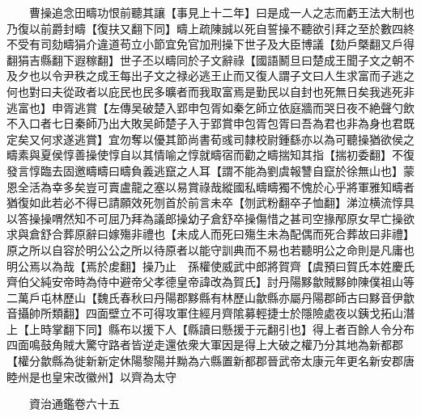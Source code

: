 　　曹操追念田疇功恨前聽其讓【事見上十二年】曰是成一人之志而虧王法大制也乃復以前爵封疇【復扶又翻下同】疇上疏陳誠以死自誓操不聽欲引拜之至於數四終不受有司劾疇狷介違道苟立小節宜免官加刑操下世子及大臣博議【劾戶槩翻又戶得翻狷吉縣翻下遐稼翻】世子丕以疇同於子文辭祿【國語鬭旦曰楚成王聞子文之朝不及夕也以令尹秩之成王每出子文之禄必逃王止而又復人謂子文曰人生求富而子逃之何也對曰夫從政者以庇民也民多曠者而我取富焉是勤民以自封也死無日矣我逃死非逃富也】申胥逃賞【左傳吴破楚入郢申包胥如秦乞師立依庭牆而哭日夜不絶聲勺飲不入口者七日秦師乃出大敗吴師楚子入于郢賞申包胥包胥曰吾為君也非為身也君既定矣又何求遂逃賞】宜勿奪以優其節尚書荀彧司隸校尉鍾繇亦以為可聽操猶欲侯之疇素與夏侯惇善操使惇自以其情喻之惇就疇宿而勸之疇揣知其指【揣初委翻】不復發言惇臨去固邀疇疇曰疇負義逃竄之人耳【謂不能為劉虞報讐自竄於徐無山也】蒙恩全活為幸多矣豈可賣盧龍之塞以易賞祿哉縱國私疇疇獨不愧於心乎將軍雅知疇者猶復如此若必不得已請願效死刎首於前言未卒【刎武粉翻卒子恤翻】涕泣横流惇具以答操操喟然知不可屈乃拜為議郎操幼子倉舒卒操傷惜之甚司空掾邴原女早亡操欲求與倉舒合葬原辭曰嫁殤非禮也【未成人而死曰殤生未為配偶而死合葬故曰非禮】原之所以自容於明公公之所以待原者以能守訓典而不易也若聽明公之命則是凡庸也明公焉以為哉【焉於䖍翻】操乃止　孫權使威武中郎將賀齊【虞預曰賀氏本姓慶氏齊伯父純安帝時為侍中避帝父孝德皇帝諱改為賀氏】討丹陽黟歙賊黟帥陳僕祖山等二萬戶屯林歷山【魏氏春秋曰丹陽郡黟縣有林歷山歙縣亦屬丹陽郡師古曰黟音伊歙音攝帥所類翻】四面壁立不可得攻軍住經月齊隂募輕捷士於隱險處夜以銕戈拓山潛上【上時掌翻下同】縣布以援下人【縣讀曰懸援于元翻引也】得上者百餘人令分布四面鳴鼓角賊大驚守路者皆逆走還依衆大軍因是得上大破之權乃分其地為新都郡【權分歙縣為徙新新定休陽黎陽并黝為六縣置新都郡晉武帝太康元年更名新安郡唐睦州是也皇宋改徽州】以齊為太守

　　資治通鑑卷六十五


    


 


 



 

 
  







 


　　
　　
　
　
　


　　

　















